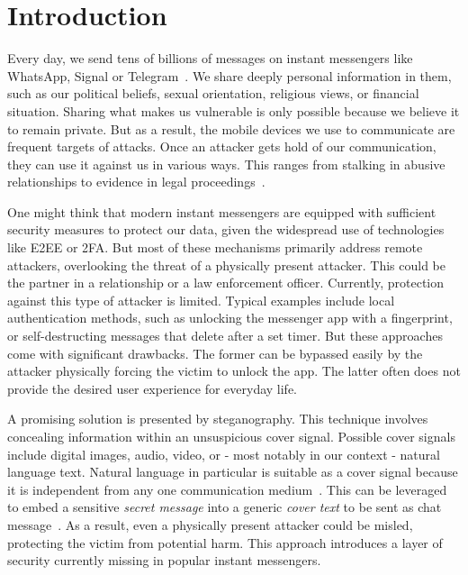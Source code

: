 
\chapter{Introduction}\label{ch:introduction}
\glsresetall %


Every day, we send tens of billions of messages on instant messengers like WhatsApp, Signal or Telegram~\cite{smithMillionWhatsAppMessages2018}. We share deeply personal information in them, such as our political beliefs, sexual orientation, religious views, or financial situation. Sharing what makes us vulnerable is only possible because we believe it to remain private. But as a result, the mobile devices we use to communicate are frequent targets of attacks. Once an attacker gets hold of our communication, they can use it against us in various ways. This ranges from stalking in abusive relationships to evidence in legal proceedings~\cite{obrienNebraskaTeenMother2022,mackeyFrenchScientistDenied2025}.

One might think that modern instant messengers are equipped with sufficient security measures to protect our data, given the widespread use of technologies like \gls{E2EE} or \gls{2FA}. But most of these mechanisms primarily address remote attackers, overlooking the threat of a physically present attacker. This could be the partner in a relationship or a law enforcement officer. Currently, protection against this type of attacker is limited. Typical examples include local authentication methods, such as unlocking the messenger app with a fingerprint, or self-destructing messages that delete after a set timer. But these approaches come with significant drawbacks. The former can be bypassed easily by the attacker physically forcing the victim to unlock the app. The latter often does not provide the desired user experience for everyday life.

A promising solution is presented by steganography. This technique involves concealing information within an unsuspicious cover signal. Possible cover signals include digital images, audio, video, or - most notably in our context - natural language text. Natural language in particular is suitable as a cover signal because it is independent from any one communication medium~\cite{zieglerNeuralLinguisticSteganography2019}. This can be leveraged to embed a sensitive \textit{secret message} into a generic \textit{cover text} to be sent as chat message~\cite{zieglerNeuralLinguisticSteganography2019}. As a result, even a physically present attacker could be misled, protecting the victim from potential harm. This approach introduces a layer of security currently missing in popular instant messengers.

